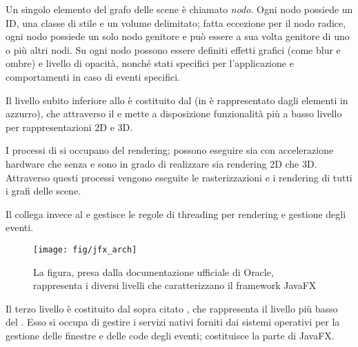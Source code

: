             Un singolo elemento del grafo delle scene è chiamato \emph{nodo}.
            Ogni nodo possiede un ID, una classe di stile e un volume delimitato;
            fatta eccezione per il nodo radice, ogni nodo possiede un solo nodo genitore e può essere a sua volta genitore di uno o più altri nodi.
            Su ogni nodo possono essere definiti effetti grafici (come blur e ombre) e livello di opacità, nonché stati specifici per l'applicazione e comportamenti in caso di eventi specifici.

            Il livello subito inferiore allo  è costituito dal  (in  è rappresentato dagli elementi in azzurro), che attraverso il  e  mette a disposizione funzionalità più a basso livello per rappresentazioni 2D e 3D.

            I processi di  si occupano del rendering;
            possono eseguire sia con accelerazione hardware che senza e sono in grado di realizzare sia rendering 2D che 3D.
            Attraverso questi processi vengono eseguite le rasterizzazioni e i rendering di tutti i grafi delle scene.

            Il  collega invece  al  e gestisce le regole di threading per rendering e gestione degli eventi.

            \begin{figure}[htbp]
                \centering
                \texttt{[image: fig/jfx\_arch]}
                \caption[La figura, presa dalla documentazione ufficiale di Oracle, rappresenta i diversi livelli che caratterizzano il framework JavaFX]{La figura, presa dalla documentazione ufficiale di Oracle\protect\footnotemark, rappresenta i diversi livelli che caratterizzano il framework JavaFX}
                \label{fig:jfxArch}
            \end{figure}

            Il terzo livello è costituito dal sopra citato , che rappresenta il livello più basso del .
            Esso si occupa di gestire i servizi nativi forniti dai sistemi operativi per la gestione delle finestre e delle code degli eventi;
            costituisce la parte  di JavaFX.


